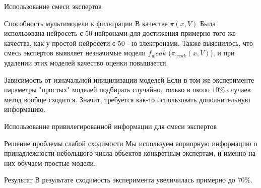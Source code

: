 \documentclass{beamer}
\begin{document}
\begin{frame}{Использование смеси экспертов}
\begin{block}{Способность мультимодели к фильтрации}
В качестве $\pi(x, V)$ Была использована нейросеть с $50$ нейронами для достижения примерно того же качества, как у  простой нейросети  с $50$ - ю электронами. Также выяснилось, что смесь экспертов выявляет незначимые модели $f_weak$ ($\pi_{weak} (x, V)$), и при удалении этих моделей качество оценки повышается. 
\end{block}


\begin{block}{Зависимость от изначальной иницилизации моделей}
Если в том же эксперименте  параметры "простых" моделей  подбирать случайно, только в около $10 \% $ случаев метод вообще  сходится. Значит, требуется как-то использовать дополнительную информацию.
\end{block}
\end{frame}


\begin{frame}{Использование привилегированной информации для смеси экспертов}
\begin{block}{Решение проблемы слабой сходимости}
Мы используем априорную информацию о принадлежности небольшого числа объектов конкретным экспертам, и именно на них 
обучаем простые модели. 

\begin{figure}[!htb]
\end{figure}

\end{block}

\begin{block}{Результат}
В результате сходимость эксперимента увеличилась примерно до $70 \%$. 
\end{block}

\end{frame}
\end{document}
